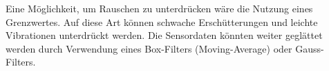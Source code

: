 Eine Möglichkeit, um Rauschen zu unterdrücken wäre die Nutzung eines Grenzwertes. Auf diese Art können schwache Erschütterungen und leichte Vibrationen unterdrückt werden.
Die Sensordaten könnten weiter geglättet werden durch Verwendung eines Box-Filters (Moving-Average) oder Gauss-Filters.




